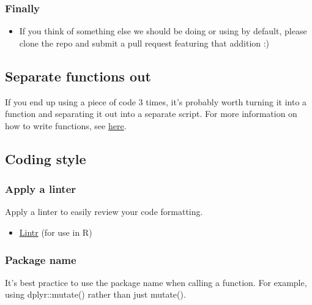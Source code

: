 \documentclass[]{book}
\providecommand{\tightlist}{%
  \setlength{\itemsep}{0pt}\setlength{\parskip}{0pt}}
\begin{document}
\hypertarget{finally}{%
\subsubsection*{Finally}\label{finally}}

\begin{itemize}
\tightlist
\item
  If you think of something else we should be doing or using by default, please clone the repo and submit a pull request featuring that addition :)
\end{itemize}

\hypertarget{functions}{%
\subsection{Separate functions out}\label{functions}}

If you end up using a piece of code 3 times, it's probably worth turning it into a function and separating it out into a separate script. For more information on how to write functions, see \href{https://github.com/moj-analytical-services/writing_functions_in_r}{here}.

\hypertarget{style}{%
\subsection{Coding style}\label{style}}

\hypertarget{linter}{%
\subsubsection{Apply a linter}\label{linter}}

Apply a linter to easily review your code formatting.

\begin{itemize}
\tightlist
\item
  \href{https://cran.r-project.org/web/packages/lintr/readme/README.html}{Lintr} (for use in R)
\end{itemize}

\hypertarget{package-name}{%
\subsubsection{Package name}\label{package-name}}

It's best practice to use the package name when calling a function. For example, using dplyr::mutate() rather than just mutate().
\end{document}
